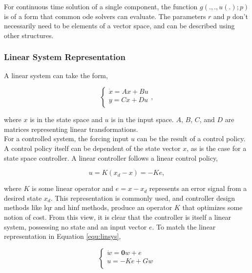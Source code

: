 For continuous time solution of a single component, the function $g(.,.,u(.);p)$ is of a form that common 
\acrshort{ode} solvers can evaluate. The parameters $r$ and $p$ don't necessarily need to be elements of a 
vector space, and can be described using other structures.

\subsubsection{Linear System Representation}

A linear system can take the form,

\begin{equation} \label{equ:linsys}
\begin{cases}
\dot{x} = A x + B u \\
y =C x + D u \\
\end{cases},
\end{equation}

where $x$ is in the state space and $u$ is in the input space. $A$, $B$, $C$, and $D$ are matrices 
representing linear transformations.   \\

For a controlled system, the forcing input $u$ can be the result of a control policy. A control policy itself can
be dependent of the state vector $x$, as is the case for a state space controller. A linear controller follows a
linear control policy,

\begin{equation}
u = K (x_d -x ) = -Ke,
\end{equation}

where $K$ is some linear operator and $e=x -x_d$ represents an error signal from a desired state $x_d$. This 
representation is commonly used, and controller design methods like \acrshort{lqr} and \acrshort{hinf} 
methods, produce an operator $K$ that optimizes some notion of cost. From this view, it is clear that the 
controller is itself a linear system, possessing no state and an input vector $e$. To match the linear 
representation in Equation \ref{equ:linsys},

\begin{equation}
\begin{cases}
\dot{w} = \mathbf{0} w + e \\
u = -K e + G w \\
\end{cases}
\end{equation}


